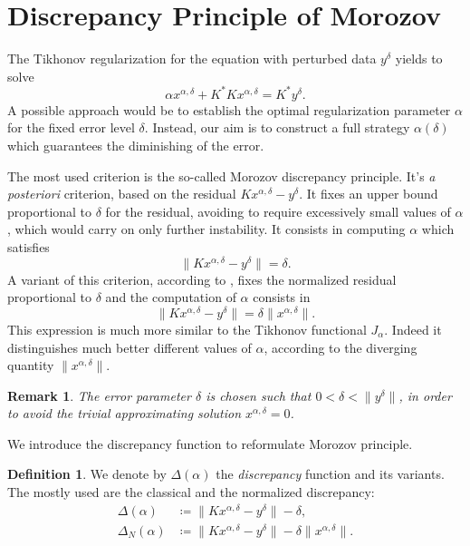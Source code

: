 \documentclass[10pt, a4paper, twoside, openright]{book}
\theoremstyle{definition}
\newtheorem{definition}[subsection]{Definition}
\theoremstyle{plain}
\theoremstyle{plain}
\theoremstyle{plain}
\theoremstyle{plain}
\newtheorem{remark}[subsection]{Remark}
\theoremstyle{plain}
\theoremstyle{plain}
\theoremstyle{plain}
\theoremstyle{plain}
\begin{document}
\section{Discrepancy Principle of Morozov}
The Tikhonov regularization for the equation with perturbed data $y^\delta$ yields to solve
\begin{equation}
\label{eq:tikh-equation-2}
 \alpha x^{\alpha, \delta} + K^*Kx^{\alpha, \delta} = K^*y^\delta.
\end{equation}
A possible approach would be to establish the optimal regularization parameter $\alpha$ for the fixed error level $\delta$. 
Instead, our aim is to construct a full strategy $\alpha(\delta)$ which guarantees the diminishing 
of the error. 
\par
The most used criterion is the so-called Morozov discrepancy principle. 
It's \emph{a posteriori} criterion, based on the residual $Kx^{\alpha,\delta} - y^\delta$. 
It fixes an upper bound proportional to $\delta$ for the residual, avoiding to require excessively small values 
of $\alpha$, which would carry on only further instability. 
It consists in computing $\alpha$ which satisfies
\begin{equation}
\label{eq:discrepancy-zero}
 \|Kx^{\alpha, \delta} - y ^\delta \|= \delta.
\end{equation}
A variant of this criterion, according to \cite{kirsch:shape-1998}, fixes the normalized residual proportional to $\delta$ and the computation of $\alpha$ consists in
\begin{equation}
\label{eq:discrepancy-relative-zero}
 \|Kx^{\alpha, \delta} - y ^\delta \|= \delta\|x^{\alpha,\delta}\|.
\end{equation}
This expression is much more similar to the Tikhonov functional $J_\alpha$.
Indeed it distinguishes much better different values of $\alpha$, according to the diverging quantity $\|x^{\alpha,\delta}\|$.
\begin{remark}
 The error parameter $\delta$ is chosen such that $0<\delta<\|y^\delta\|$, in order to avoid the trivial approximating solution $x^{\alpha,\delta}= 0$.
\end{remark}
We introduce the discrepancy function to reformulate Morozov principle.
\begin{definition}
 We denote by $\Delta(\alpha)$ the \emph{discrepancy} function and its variants. The mostly used 
 are the classical and the normalized discrepancy:
 \begin{align}
  \Delta(\alpha)&\coloneqq\|Kx^{\alpha,\delta} - y^\delta\| - \delta, \label{eq:def-disc}\\
  \Delta_N(\alpha)&\coloneqq\|Kx^{\alpha,\delta} - y^\delta\| - \delta\|x^{\alpha,\delta}\|.\label{eq:def-disc-N}
 \end{align}
\end{definition}
\end{document}
